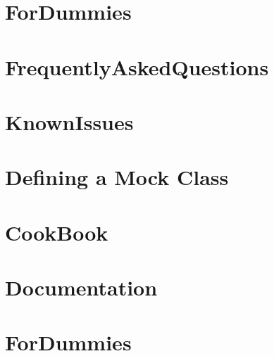 \documentclass[twoside]{book}
\newcommand{\+}{\discretionary{\mbox{\scriptsize$\hookleftarrow$}}{}{}}
\begin{document}
\chapter{For\+Dummies}
\label{md_vendor_googletest_googlemock_docs_ForDummies}
\hypertarget{md_vendor_googletest_googlemock_docs_ForDummies}{}

\chapter{Frequently\+Asked\+Questions}
\label{md_vendor_googletest_googlemock_docs_FrequentlyAskedQuestions}
\hypertarget{md_vendor_googletest_googlemock_docs_FrequentlyAskedQuestions}{}

\chapter{Known\+Issues}
\label{md_vendor_googletest_googlemock_docs_KnownIssues}
\hypertarget{md_vendor_googletest_googlemock_docs_KnownIssues}{}

\chapter{Defining a Mock Class}
\label{md_vendor_googletest_googlemock_docs_v1_5_CheatSheet}
\hypertarget{md_vendor_googletest_googlemock_docs_v1_5_CheatSheet}{}

\chapter{Cook\+Book}
\label{md_vendor_googletest_googlemock_docs_v1_5_CookBook}
\hypertarget{md_vendor_googletest_googlemock_docs_v1_5_CookBook}{}

\chapter{Documentation}
\label{md_vendor_googletest_googlemock_docs_v1_5_Documentation}
\hypertarget{md_vendor_googletest_googlemock_docs_v1_5_Documentation}{}

\chapter{For\+Dummies}
\label{md_vendor_googletest_googlemock_docs_v1_5_ForDummies}
\hypertarget{md_vendor_googletest_googlemock_docs_v1_5_ForDummies}{}

\end{document}

